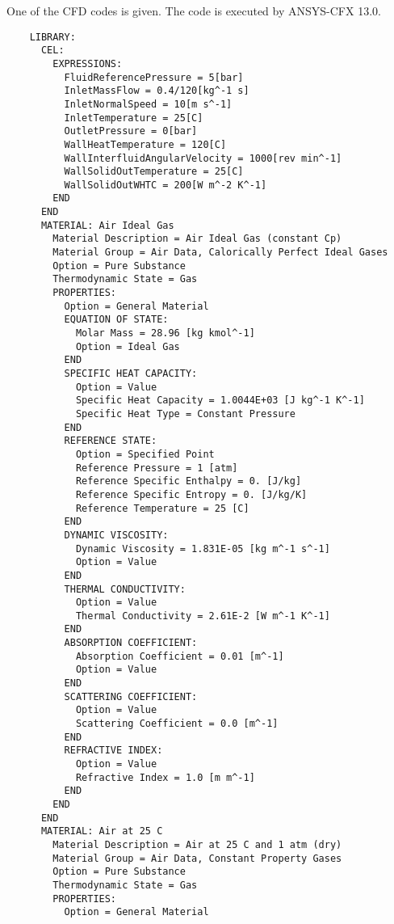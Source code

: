 \renewcommand{\baselinestretch}{1.0}


    One of the CFD codes is given. The code is executed by ANSYS-CFX 13.0.
    \scriptsize
    \begin{verbatim}
    LIBRARY:
      CEL:
        EXPRESSIONS:
          FluidReferencePressure = 5[bar]
          InletMassFlow = 0.4/120[kg^-1 s]
          InletNormalSpeed = 10[m s^-1]
          InletTemperature = 25[C]
          OutletPressure = 0[bar]
          WallHeatTemperature = 120[C]
          WallInterfluidAngularVelocity = 1000[rev min^-1]
          WallSolidOutTemperature = 25[C]
          WallSolidOutWHTC = 200[W m^-2 K^-1]
        END
      END
      MATERIAL: Air Ideal Gas
        Material Description = Air Ideal Gas (constant Cp)
        Material Group = Air Data, Calorically Perfect Ideal Gases
        Option = Pure Substance
        Thermodynamic State = Gas
        PROPERTIES:
          Option = General Material
          EQUATION OF STATE:
            Molar Mass = 28.96 [kg kmol^-1]
            Option = Ideal Gas
          END
          SPECIFIC HEAT CAPACITY:
            Option = Value
            Specific Heat Capacity = 1.0044E+03 [J kg^-1 K^-1]
            Specific Heat Type = Constant Pressure
          END
          REFERENCE STATE:
            Option = Specified Point
            Reference Pressure = 1 [atm]
            Reference Specific Enthalpy = 0. [J/kg]
            Reference Specific Entropy = 0. [J/kg/K]
            Reference Temperature = 25 [C]
          END
          DYNAMIC VISCOSITY:
            Dynamic Viscosity = 1.831E-05 [kg m^-1 s^-1]
            Option = Value
          END
          THERMAL CONDUCTIVITY:
            Option = Value
            Thermal Conductivity = 2.61E-2 [W m^-1 K^-1]
          END
          ABSORPTION COEFFICIENT:
            Absorption Coefficient = 0.01 [m^-1]
            Option = Value
          END
          SCATTERING COEFFICIENT:
            Option = Value
            Scattering Coefficient = 0.0 [m^-1]
          END
          REFRACTIVE INDEX:
            Option = Value
            Refractive Index = 1.0 [m m^-1]
          END
        END
      END
      MATERIAL: Air at 25 C
        Material Description = Air at 25 C and 1 atm (dry)
        Material Group = Air Data, Constant Property Gases
        Option = Pure Substance
        Thermodynamic State = Gas
        PROPERTIES:
          Option = General Material

\end{verbatim}
